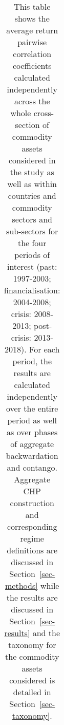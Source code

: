\documentclass[
  authoryear,
  preprint,
  3p]{elsarticle}
\begin{document}
\begin{longtable}[t]{>{}l>{}l>{}l>{}r>{}r>{}r>{}r>{}r}

\caption{\label{tbl-correlations-inner-periods}This table shows the
average return pairwise correlation coefficients calculated
independently across the whole cross-section of commodity assets
considered in the study as well as within countries and commodity
sectors and sub-sectors for the four periods of interest (past:
1997-2003; financialisation: 2004-2008; crisis: 2008-2013; post-crisis:
2013-2018). For each period, the results are calculated independently
over the entire period as well as over phases of aggregate backwardation
and contango. Aggregate CHP construction and corresponding regime
definitions are discussed in Section~\ref{sec-methods} while the results
are discussed in Section~\ref{sec-results} and the taxonomy for the
commodity assets considered is detailed in Section~\ref{sec-taxonomy}.}

\tabularnewline


\end{longtable}
\end{document}
